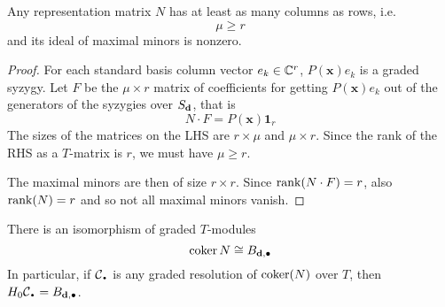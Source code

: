 \documentclass[fleqn,reqno]{amsart}
\begin{document}
\begin{lemma}
\label{lemma:nonzero-detM}
Any representation matrix $N$ has at least as many columns as rows, i.e.
\[
	\mu\geq r
\]
and its ideal of maximal minors is nonzero.
\end{lemma}

\begin{proof}
For each standard basis column vector $e_k\in\mathbb{C}^r$, $P(\mathbf x)e_k$ is a graded syzygy.
Let $F$ be the $\mu\times r$ matrix of coefficients for getting $P(\mathbf x)e_k$
out of the generators of the syzygies over $S_\mathbf d$, that is
\[
	N\cdot F=P(\mathbf x)\mathbf 1_r
\]
The sizes of the matrices on the LHS are $r\times\mu$ and $\mu\times r$.
Since the rank of the RHS as a $T$-matrix is $r$, we must have $\mu\geq r$.

The maximal minors are then of size $r\times r$. Since $\operatorname{rank}(N\cdot F)=r$,
also $\operatorname{rank}(N)=r$ and so not all maximal minors vanish.
\end{proof}

\begin{lemma}
\label{lemma:cokerN}
There is an isomorphism of graded $T$-modules
\[
	\operatorname{coker} N\cong B_{\mathbf d,\bullet}
\]
In particular, if $\mathcal{C}_\nbul$ is any graded resolution of $\operatorname{coker}(N)$ over $T$,
then $H_0\mathcal{C}_\nbul=B_{\d,\bullet}$.
\end{lemma}
\end{document}

